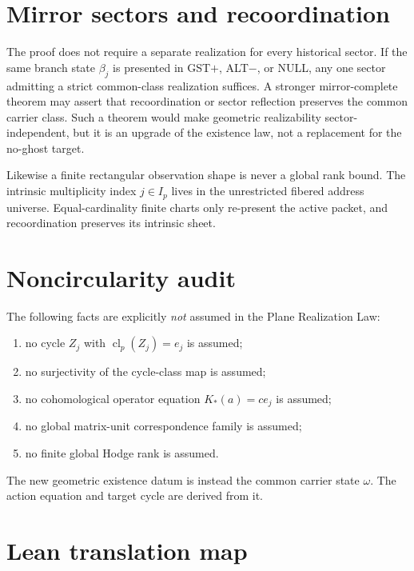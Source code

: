 \documentclass[11pt]{article}
\newcommand{\cl}{\operatorname{cl}}
\begin{document}
\section{Mirror sectors and recoordination}

The proof does not require a separate realization for every historical sector.
If the same branch state $\beta_j$ is presented in GST$+$, ALT$-$, or NULL,
any one sector admitting a strict common-class realization suffices.  A stronger
mirror-complete theorem may assert that recoordination or sector reflection
preserves the common carrier class.  Such a theorem would make geometric
realizability sector-independent, but it is an upgrade of the existence law,
not a replacement for the no-ghost target.

Likewise a finite rectangular observation shape is never a global rank bound.
The intrinsic multiplicity index $j\in I_p$ lives in the unrestricted fibered
address universe.  Equal-cardinality finite charts only re-present the active
packet, and recoordination preserves its intrinsic sheet.

\section{Noncircularity audit}

The following facts are explicitly \emph{not} assumed in the Plane Realization
Law:
\begin{enumerate}[label=(\alph*)]
  \item no cycle $Z_j$ with $\cl_p(Z_j)=e_j$ is assumed;
  \item no surjectivity of the cycle-class map is assumed;
  \item no cohomological operator equation $K_*(a)=c e_j$ is assumed;
  \item no global matrix-unit correspondence family is assumed;
  \item no finite global Hodge rank is assumed.
\end{enumerate}
The new geometric existence datum is instead the common carrier state $\omega$.
The action equation and target cycle are derived from it.

\section{Lean translation map}
\end{document}
